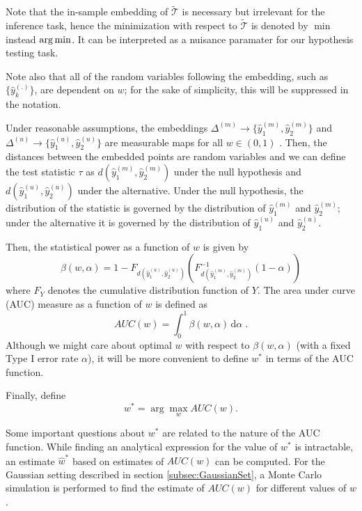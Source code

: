 \documentclass[12pt,oneside,final]{thesis}\usepackage[]{graphicx}\usepackage[]{color}
\begin{document}
\begin{remark}
 Note that the in-sample embedding of $\widetilde{\mathcal{T}}$ is necessary but irrelevant for the inference task, hence the minimization with respect to $\widetilde{\mathcal{T}}$ is denoted by  $\min$ instead $\arg\min$. It can be interpreted as a nuisance paramater for our hypothesis testing task.
\end{remark}
\begin{remark}
 Note also that  all of the random variables following the embedding, such as $\{\hat{y}_{k}^{(.)}\}\!$,  are dependent on $w$; for the sake of simplicity, this will  be suppressed in the notation. 
\end{remark}

 Under reasonable assumptions, the embeddings $\Delta^{(m)} \rightarrow  \{\hat{y}_{1}^{(m)},\hat{y}_{2}^{(m)}\!\}$  and $\Delta^{(u)}\rightarrow \{\hat{y}_{1}^{(u)} , \hat{y}_{2}^{(u)}\}$ are measurable maps for all $w \in (0,1)$ \cite{measurable_Niemiro1992}. Then, the distances between the embedded points are random variables and we can define the test statistic $\tau$ as $d(\hat{y}_{1}^{(m)},\hat{y}_{2}^{(m)})$ under the null hypothesis  and $d(\hat{y}_{1}^{(u)},\hat{y}_{2}^{(u)})$ under the alternative. Under the null hypothesis, the distribution of the statistic is governed by the distribution of $\hat{y}_{1}^{(m)}$ and $\hat{y}_{2}^{(m)}$; under the alternative it is governed by  the distribution of $\hat{y}_{1}^{(u)}$ and $\hat{y}_{2}^{(u)}$.

 Then, the statistical power as a function of $w$ is given by  \[\beta\left( w,\alpha\right)=1-F_{d \left(\hat{y}_{1}^{(u)},\hat{y}_{2}^{(u)}\right)} \left(F_{d\left(\hat{y}_{1}^{(m)},\hat{y}_{2}^{(m)}\right)}^{-1}(1-\alpha) \right)\] where $F_Y$ denotes  the   cumulative distribution function of  $Y$. The area under curve (AUC) measure  as a function of $w$ is defined as  
\begin{equation} 
AUC(w)=\int_{0}^{1}\! \beta\left( w,\alpha\right)\,\mathrm{d}\alpha \; . \label{AUC_def}
\end{equation} 
Although we might care about optimal $w$ with respect to  $\beta\left( w,\alpha\right)$ (with a fixed Type I error rate $\alpha$),  it will be more convenient to define $w^*$ in terms of the AUC function.

 Finally, define $$w^{*}=\arg\max_w{AUC\left( w\right)}. $$

 Some important questions about $w^*$ are  related to the nature of the AUC function.
While finding an analytical expression for the value of $w^*$ is intractable, an estimate $\hat{w}^*$  based on  estimates of $AUC(w)$ %
 can be computed.  For the Gaussian setting described in  section \ref{subsec:GaussianSet}, a Monte Carlo simulation is performed  to find the estimate of $AUC(w)$ for different values of $w$.
\end{document}
